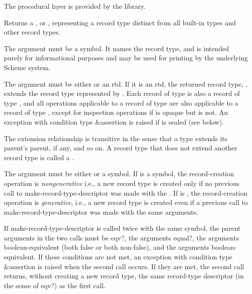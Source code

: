 The procedural layer is provided by the  library.

\begin{entry}{%
}
   
Returns a , or ,
representing a record type distinct from all built-in types and
other record types.

The  argument must be a symbol. It names the record type,
and is intended purely for informational purposes and may be used for printing by
the underlying Scheme system.

The  argument must be either \schfalse{} or an rtd. If it is an
rtd, the returned record type, , extends the record type
 represented by . Each record of type  is also a
record of type , and all operations applicable to a record of
type  are also applicable to a record of type , except for
inspection operations if  is opaque but  is not. An exception with
condition type {\cf\&assertion} is raised if  is sealed (see below).
   
The extension relationship is transitive in the sense that a type extends
its parent's parent, if any, and so on.  A record type that does not
extend another record type is called a .
   
The  argument must be either \schfalse{} or a symbol.
If  is a symbol, the record-creation operation is
\emph{nongenerative} i.e., a new record type is created only
if no previous call to {\cf make-record-type-descriptor}
was made with the .
If  is \schfalse{}, the record-creation operation is
\emph{generative}, i.e., a new record type is created even if
a previous call to {\cf make-record-type-descriptor} was
made with the same arguments.

If {\cf make-record-type-descriptor} is
called twice with the same  symbol, the parent
arguments in the two calls must be {\cf eqv?}, the 
arguments {\cf equal?}, the  arguments boolean-equivalent
(both false or both non-false), and the  arguments
boolean-equivalent.
If these conditions are not met, an exception with condition type
{\cf\&assertion} is raised when the second call occurs.
If they are met, the second call returns, without creating a new
record type, the same record-type descriptor
(in the sense of {\cf eqv?}) as the first call.


\end{entry}
